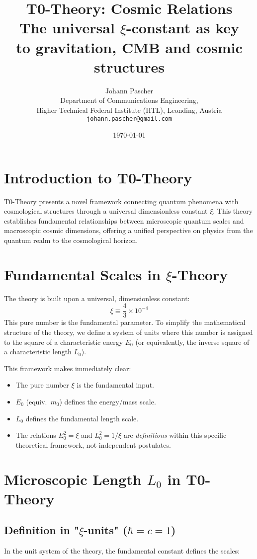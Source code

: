 \documentclass[12pt,a4paper]{article}
\title{\Huge\textbf{T0-Theory: Cosmic Relations}\\
	\Large The universal $\xi$-constant as key \\ to gravitation, CMB and cosmic structures}
\author{\Large Johann Pascher\\
	Department of Communications Engineering,\\
	Higher Technical Federal Institute (HTL), Leonding, Austria\\
	\texttt{johann.pascher@gmail.com}}
\date{\today}
\numberwithin{equation}{section}
\begin{document}
	
	\maketitle
	\thispagestyle{fancy}
	
	\tableofcontents
	
	\section{Introduction to T0-Theory}
	
	T0-Theory presents a novel framework connecting quantum phenomena with cosmological structures through a universal dimensionless constant $\xi$. This theory establishes fundamental relationships between microscopic quantum scales and macroscopic cosmic dimensions, offering a unified perspective on physics from the quantum realm to the cosmological horizon.
	
	\section{Fundamental Scales in $\xi$-Theory}
	
	The theory is built upon a universal, dimensionless constant:
	\[
	\xi \equiv \frac{4}{3} \times 10^{-4}
	\]
	This pure number is the fundamental parameter. To simplify the mathematical structure of the theory, we define a system of units where this number is assigned to the square of a characteristic energy $E_0$ (or equivalently, the inverse square of a characteristic length $L_0$).
	
	
	
	This framework makes immediately clear:
	\begin{itemize}
		\item The pure number $\xi$ is the fundamental input.
		\item $E_0$ (equiv.\ $m_0$) defines the energy/mass scale.
		\item $L_0$ defines the fundamental length scale.
		\item The relations $E_0^2 = \xi$ and $L_0^2 = 1/\xi$ are \textit{definitions} within this specific theoretical framework, not independent postulates.
	\end{itemize}
	
	\section{Microscopic Length $L_0$ in T0-Theory}
	
	\subsection{Definition in "$\xi$-units" ($\hbar = c = 1$)}
	In the unit system of the theory, the fundamental constant defines the scales:
	
\end{document}
